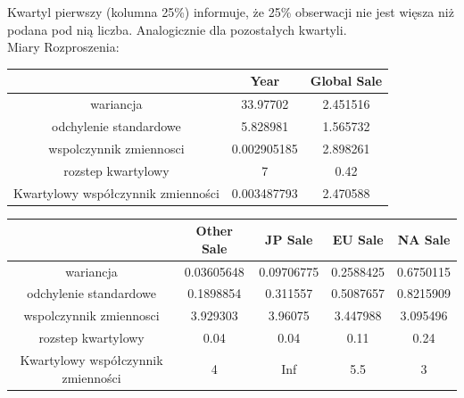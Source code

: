 \documentclass[12pt]{article}
\begin{document}
Kwartyl pierwszy (kolumna 25\%) informuje, że 25\% obserwacji nie jest więsza niż podana pod nią liczba. Analogicznie dla pozostałych kwartyli.\\

\newpage
	Miary Rozproszenia:
	\begin{table}[h]
		\centering
		\begin{tabular}{|c|c|c|}
			\hline
			\multicolumn{1}{|l|}{}             & Year                                & Global Sale                      \\ \hline
			wariancja                          & \cellcolor[HTML]{FFFFFF}33.97702    & \cellcolor[HTML]{FFFFFF}2.451516 \\ \hline
			odchylenie standardowe             & \cellcolor[HTML]{FFFFFF}5.828981    & 1.565732                         \\ \hline
			wspolczynnik zmiennosci            & 0.002905185                         & \cellcolor[HTML]{FFFFFF}2.898261 \\ \hline
			rozstep kwartylowy                 & \cellcolor[HTML]{FFFFFF}7           & 0.42                             \\ \hline
			Kwartylowy współczynnik zmienności & \cellcolor[HTML]{FFFFFF}0.003487793 & \cellcolor[HTML]{FFFFFF}2.470588 \\ \hline
		\end{tabular}
	\end{table}
	\begin{table}[H]
	\centering
	\begin{tabular}{|c|c|c|c|c|}
		\hline
		\multicolumn{1}{|l|}{}             & Other Sale                                & JP Sale    & EU Sale          & NA Sale              \\ \hline
		wariancja                          & \cellcolor[HTML]{FFFFFF}0.03605648    & \cellcolor[HTML]{FFFFFF}0.09706775 & \cellcolor[HTML]{FFFFFF}0.2588425& \cellcolor[HTML]{FFFFFF}0.6750115\\ \hline
		odchylenie standardowe             & \cellcolor[HTML]{FFFFFF}0.1898854  & 0.311557       & \cellcolor[HTML]{FFFFFF}0.5087657    & \cellcolor[HTML]{FFFFFF}0.8215909             \\ \hline
		wspolczynnik zmiennosci            & 3.929303                       & \cellcolor[HTML]{FFFFFF}3.96075 & \cellcolor[HTML]{FFFFFF}3.447988 & \cellcolor[HTML]{FFFFFF}3.095496\\ \hline
		rozstep kwartylowy                 & \cellcolor[HTML]{FFFFFF}0.04           & 0.04   & \cellcolor[HTML]{FFFFFF}0.11     & \cellcolor[HTML]{FFFFFF}0.24                         \\ \hline
		Kwartylowy współczynnik zmienności & \cellcolor[HTML]{FFFFFF}4 & \cellcolor[HTML]{FFFFFF}Inf& \cellcolor[HTML]{FFFFFF} 5.5 & \cellcolor[HTML]{FFFFFF} 3\\ \hline
	\end{tabular}
\end{table}
\end{document}
